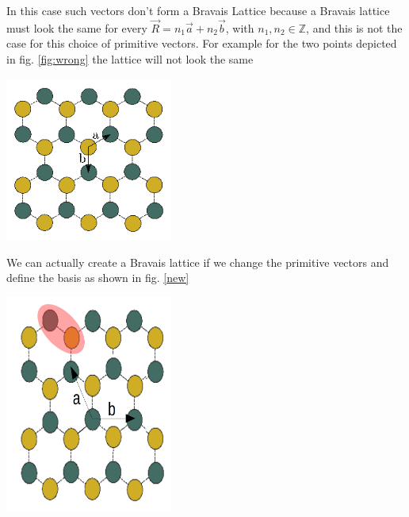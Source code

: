 \begin{questions}
\begin{solution}
  In this case such vectors don't form a Bravais Lattice because a Bravais lattice must look the same for every $\vec{R} = n_1\vec{a} + n_2 \vec{b}$, with $n_1,n_2\in \mathbb{Z}$, and this is not the case for this choice of primitive vectors.
  For example for the two points depicted in fig. \ref{fig:wrong} the lattice will not look the same
\begin{center}
  \includegraphics[width=55mm]{original}\label{fig:wrong}
\end{center}

\end{solution}

\begin{solution}

We can actually create a Bravais lattice if we change the primitive vectors and define the basis as shown in fig. \ref{new}

\begin{center}
  \includegraphics[width=55mm]{lat}\label{new}
\end{center}


\end{solution}
\end{questions}
